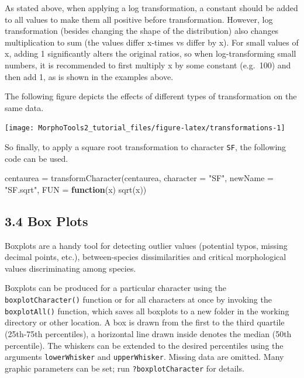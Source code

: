 \documentclass[
  11pt,
  a4paper]{article}
\newenvironment{Shaded}{\begin{snugshade}}{\end{snugshade}}
\newcommand{\AttributeTok}[1]{\textcolor[rgb]{0.77,0.63,0.00}{#1}}
\newcommand{\ControlFlowTok}[1]{\textcolor[rgb]{0.13,0.29,0.53}{\textbf{#1}}}
\newcommand{\FunctionTok}[1]{\textcolor[rgb]{0.00,0.00,0.00}{#1}}
\newcommand{\NormalTok}[1]{#1}
\newcommand{\OtherTok}[1]{\textcolor[rgb]{0.56,0.35,0.01}{#1}}
\newcommand{\StringTok}[1]{\textcolor[rgb]{0.31,0.60,0.02}{#1}}
\begin{document}
As stated above, when applying a log transformation, a constant should
be added to all values to make them all positive before transformation.
However, log transformation (besides changing the shape of the
distribution) also changes multiplication to sum (the values differ
x-times vs differ by x). For small values of x, adding 1 significantly
alters the original ratios, so when log-transforming small numbers, it
is recommended to first multiply x by some constant (e.g.~100) and then
add 1, as is shown in the examples above.

The following figure depicts the effects of different types of
transformation on the same data.

\begin{center}\texttt{[image: MorphoTools2\_tutorial\_files/figure-latex/transformations-1]} \end{center}

So finally, to apply a square root transformation to character
\texttt{SF}, the following code can be used.

\begin{Shaded}
\begin{Highlighting}[]
\NormalTok{centaurea }\OtherTok{=} \FunctionTok{transformCharacter}\NormalTok{(centaurea, }\AttributeTok{character =} \StringTok{"SF"}\NormalTok{, }\AttributeTok{newName =} \StringTok{"SF.sqrt"}\NormalTok{, }
                               \AttributeTok{FUN =} \ControlFlowTok{function}\NormalTok{(x) }\FunctionTok{sqrt}\NormalTok{(x))}
\end{Highlighting}
\end{Shaded}

\newpage

\hypertarget{box-plots}{%
\subsection{3.4 Box Plots}\label{box-plots}}

Boxplots are a handy tool for detecting outlier values (potential typos,
missing decimal points, etc.), between-species dissimilarities and
critical morphological values discriminating among species.

Boxplots can be produced for a particular character using the
\texttt{boxplotCharacter()} function or for all characters at once by
invoking the \texttt{boxplotAll()} function, which saves all boxplots to
a new folder in the working directory or other location. A box is drawn
from the first to the third quartile (25th-75th percentiles), a
horizontal line drawn inside denotes the median (50th percentile). The
whiskers can be extended to the desired percentiles using the arguments
\texttt{lowerWhisker} and \texttt{upperWhisker}. Missing data are
omitted. Many graphic parameters can be set; run
\texttt{?boxplotCharacter} for details.
\end{document}
